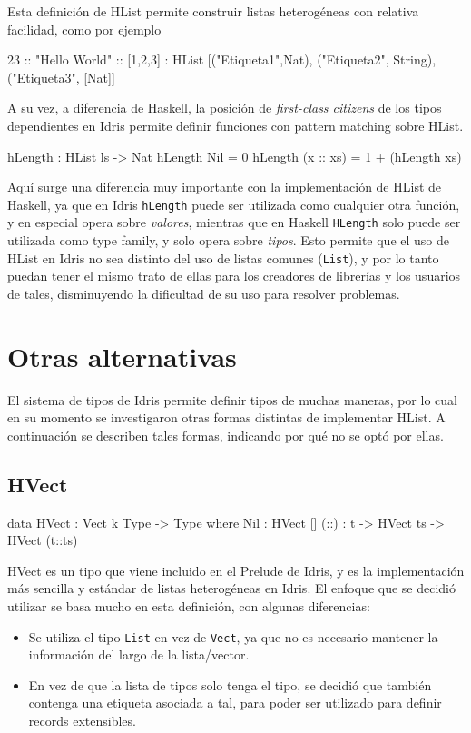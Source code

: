 Esta definición de HList permite construir listas heterogéneas con relativa facilidad, como por ejemplo 

\begin{code}
23 :: "Hello World" :: [1,2,3] :
HList [("Etiqueta1",Nat), ("Etiqueta2", String), ("Etiqueta3", [Nat]]
\end{code}

A su vez, a diferencia de Haskell, la posición de \textit{first-class citizens} de los tipos dependientes en Idris permite definir funciones con pattern matching sobre HList.

\begin{code}
hLength : HList ls -> Nat
hLength Nil = 0
hLength (x :: xs) = 1 + (hLength xs)
\end{code}

Aquí surge una diferencia muy importante con la implementación de HList de Haskell, ya que en Idris \texttt{hLength} puede ser utilizada como cualquier otra función, y en especial opera sobre \textit{valores}, mientras que en Haskell \texttt{HLength} solo puede ser utilizada como type family, y solo opera sobre \textit{tipos}.
Esto permite que el uso de HList en Idris no sea distinto del uso de listas comunes (\texttt{List}), y por lo tanto puedan tener el mismo trato de ellas para los creadores de librerías y los usuarios de tales, disminuyendo la dificultad de su uso para resolver problemas.

\section{Otras alternativas}

El sistema de tipos de Idris permite definir tipos de muchas maneras, por lo cual en su momento se investigaron otras formas distintas de implementar HList.
A continuación se describen tales formas, indicando por qué no se optó por ellas.


\subsection{HVect}

\begin{code}
data HVect : Vect k Type -> Type where
  Nil : HVect []
  (::) : t -> HVect ts -> HVect (t::ts)
\end{code}

HVect es un tipo que viene incluido en el Prelude de Idris, y es la implementación más sencilla y estándar de listas heterogéneas en Idris. El enfoque que se decidió utilizar se basa mucho en esta definición, con algunas diferencias:
\begin{itemize}[noitemsep]
\item Se utiliza el tipo \texttt{List} en vez de \texttt{Vect}, ya que no es necesario mantener la información del largo de la lista/vector.
\item En vez de que la lista de tipos solo tenga el tipo, se decidió que también contenga una etiqueta asociada a tal, para poder ser utilizado para definir records extensibles.
\end{itemize}

